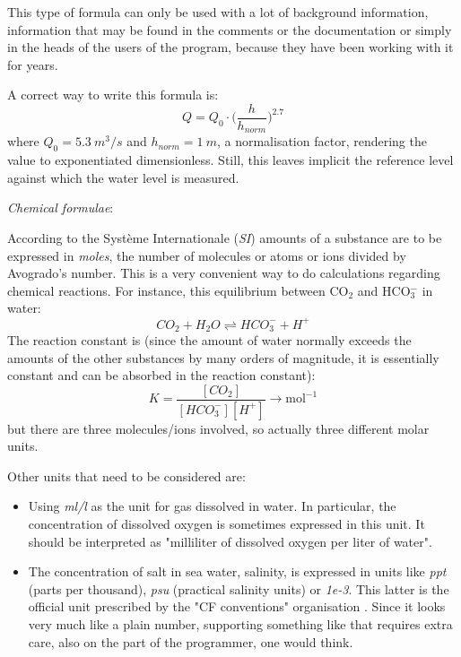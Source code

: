 \documentclass{article}
\begin{document}
This type of formula can only be used with a lot of background information, information that may be found in the
comments or the documentation or simply in the heads of the users of the program, because they have been working with
it for years.

A correct way to write this formula is:
%
\begin{equation}
    Q = Q_0 \cdot \bigl (\frac{h}{h_{norm}} \bigr)^{2.7}
\end{equation}
%
\noindent where $Q_0 = 5.3~m^3/s$ and $h_{norm} = 1~m$, a normalisation factor, rendering the value to exponentiated
dimensionless. Still, this leaves implicit the reference level against which the water level is measured.

\vspace{\baselineskip}
\noindent \emph{Chemical formulae}:

\noindent According to the Syst\`eme Internationale (\emph{SI}) amounts of a substance are to be expressed in \emph{moles}, the number of molecules or atoms
or ions divided by Avogrado's number. This is a very convenient way to do calculations regarding chemical reactions.
For instance, this equilibrium between CO$_2$ and HCO$_3^-$ in water:
\begin{equation}
    CO_2 + H_2O \rightleftharpoons HCO_3^- + H^+
\end{equation}
%
The reaction constant is (since the amount of water normally exceeds the amounts of the other substances by many
orders of magnitude, it is essentially constant and can be absorbed in the reaction constant):
\begin{equation}
    K = \frac{[CO_2]}{[HCO_3^-][H^+]} \rightarrow \textrm{mol}^{-1}
\end{equation}
%
\noindent but there are three molecules/ions involved, so actually three different molar units.

Other units that need to be considered are:
\begin{itemize}
\item
Using \emph{ml/l} as the unit for gas dissolved in water. In particular, the concentration of dissolved oxygen is
sometimes expressed in this unit. It should be interpreted as "milliliter of dissolved oxygen per liter of water".
\item
The concentration of salt in sea water, salinity, is expressed in units like \emph{ppt} (parts per thousand), \emph{psu}
(practical salinity units) or \emph{1e-3}. This latter is the official unit prescribed by the "CF conventions" organisation
\cite{CFConventionsStandardNames}.
Since it looks very much like a plain number, supporting something like that requires extra care, also on the part of
the programmer, one would think.
\end{itemize}
\end{document}
